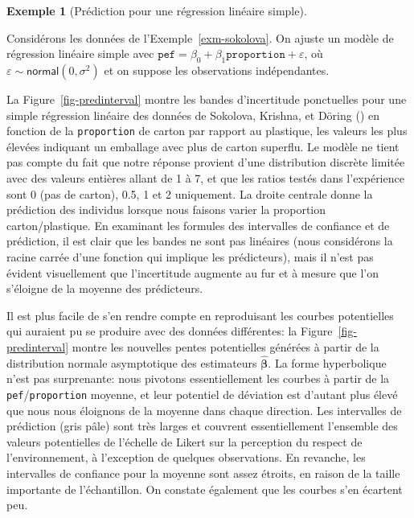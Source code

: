 \documentclass[
  11pt,
  letterpaper,
]{scrbook}
\theoremstyle{definition}
\newtheorem{example}{Exemple}[chapter]
\theoremstyle{definition}
\theoremstyle{plain}
\theoremstyle{plain}
\theoremstyle{remark}
\begin{document}
\begin{example}[Prédiction pour une régression linéaire
simple]\protect\hypertarget{exm-sokolova-pred}{}\label{exm-sokolova-pred}

Considérons les données de l'Exemple~\ref{exm-sokolova}. On ajuste un
modèle de régression linéaire simple avec
\(\texttt{pef} = \beta_0 + \beta_1 \texttt{proportion} + \varepsilon\),
où \(\varepsilon \sim \mathsf{normal}(0,\sigma^2)\) et on suppose les
observations indépendantes.

La Figure~\ref{fig-predinterval} montre les bandes d'incertitude
ponctuelles pour une simple régression linéaire des données de Sokolova,
Krishna, et Döring () en fonction de
la \texttt{proportion} de carton par rapport au plastique, les valeurs
les plus élevées indiquant un emballage avec plus de carton superflu. Le
modèle ne tient pas compte du fait que notre réponse provient d'une
distribution discrète limitée avec des valeurs entières allant de 1 à 7,
et que les ratios testés dans l'expérience sont 0 (pas de carton), 0.5,
1 et 2 uniquement. La droite centrale donne la prédiction des individus
lorsque nous faisons varier la proportion carton/plastique. En examinant
les formules des intervalles de confiance et de prédiction, il est clair
que les bandes ne sont pas linéaires (nous considérons la racine carrée
d'une fonction qui implique les prédicteurs), mais il n'est pas évident
visuellement que l'incertitude augmente au fur et à mesure que l'on
s'éloigne de la moyenne des prédicteurs.

Il est plus facile de s'en rendre compte en reproduisant les courbes
potentielles qui auraient pu se produire avec des données différentes:
la Figure~\ref{fig-predinterval} montre les nouvelles pentes
potentielles générées à partir de la distribution normale asymptotique
des estimateurs \(\widehat{\boldsymbol{\beta}}\). La forme hyperbolique
n'est pas surprenante: nous pivotons essentiellement les courbes à
partir de la \texttt{pef}/\texttt{proportion} moyenne, et leur potentiel
de déviation est d'autant plus élevé que nous nous éloignons de la
moyenne dans chaque direction. Les intervalles de prédiction (gris pâle)
sont très larges et couvrent essentiellement l'ensemble des valeurs
potentielles de l'échelle de Likert sur la perception du respect de
l'environnement, à l'exception de quelques observations. En revanche,
les intervalles de confiance pour la moyenne sont assez étroits, en
raison de la taille importante de l'échantillon. On constate également
que les courbes s'en écartent peu.


\end{example}
\end{document}

